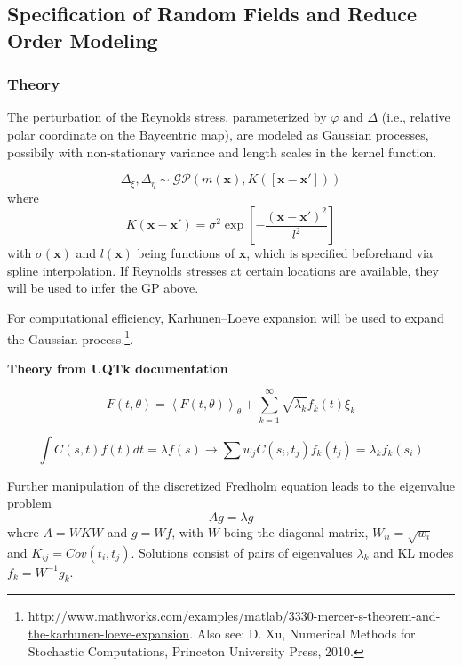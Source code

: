 \documentclass[paper = letter, fontsize = 11pt]{scrartcl} %
\begin{document}
\subsection{Specification of Random Fields and Reduce Order Modeling}

\subsubsection{Theory}
The perturbation of the Reynolds stress, parameterized by $\varphi$ and $\Delta$ (i.e., relative polar
coordinate on the Baycentric map), are modeled as Gaussian processes, possibily with non-stationary
variance and length scales in the kernel function.

\begin{equation}
\Delta_\xi, \Delta_\eta \sim \mathcal{GP}(m(\mathbf{x}), K([\mathbf{x}-\mathbf{x}'])) 
\end{equation}
where
\begin{equation}
  \label{eq:kernel}
  K(\mathbf{x} - \mathbf{x}') = \sigma^2 \exp \left[  -\frac{(\mathbf{x}-\mathbf{x}')^2}{l^2}  \right]
\end{equation}
with $\sigma(\mathbf{x})$ and $l(\mathbf{x})$ being functions of $\mathbf{x}$, which is specified
beforehand via spline interpolation.  If Reynolds stresses at certain locations are available, they will be used to infer the
GP above.

For computational efficiency, Karhunen--Loeve expansion will be used to expand the Gaussian
process.\footnote{\url{http://www.mathworks.com/examples/matlab/3330-mercer-s-theorem-and-the-karhunen-loeve-expansion}.
  Also see: D. Xu, Numerical Methods for Stochastic Computations, Princeton University Press,
  2010.}.

\textbf{Theory from UQTk documentation}

\begin{equation}
F(t,\theta)  = \left < F(t,\theta) \right >_{\theta}                                                          
                + \sum_{k=1}^{\infty} \sqrt{\lambda_k} f_k(t) \xi_k 
\end{equation}

\begin{equation}
  \int C(s,t)f(t)dt  =\lambda f(s) \rightarrow \sum w_j C(s_i,t_j) f_k(t_j) = \lambda_k f_k(s_i)                  
\end{equation}

Further manipulation of the discretized Fredholm equation leads to the eigenvalue problem
\begin{equation}
  \label{eq:dis-ag}
A g=\lambda g  
\end{equation}
where $A=W K W$ and $g=Wf$, with $W$ being the diagonal matrix, $W_{ii}=\sqrt{w_i}$ and
$K_{ij}=Cov(t_i,t_j)$. Solutions consist of pairs of eigenvalues $\lambda_k$ and KL modes $f_k=W^{
  -1}g_k$.
\end{document}
